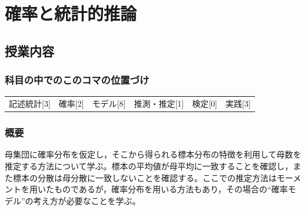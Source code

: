 \section{確率と統計的推論}
\label{s16_inference}

\subsection{授業内容}
\subsubsection{科目の中でのこのコマの位置づけ}
\begin{tabular}[t]{cccccc}
	記述統計[3] & 確率[2] & モデル[8] & 推測・推定[1] & 検定[0] & 実践[3]
\end{tabular}
\subsubsection{概要}
母集団に確率分布を仮定し，そこから得られる標本分布の特徴を利用して母数を推定する方法について学ぶ。標本の平均値が母平均に一致することを確認し，また標本の分散は母分散に一致しないことを確認する。ここでの推定方法はモーメントを用いたものであるが，確率分布を用いる方法もあり，その場合の``確率モデル''の考え方が必要なことを学ぶ。
